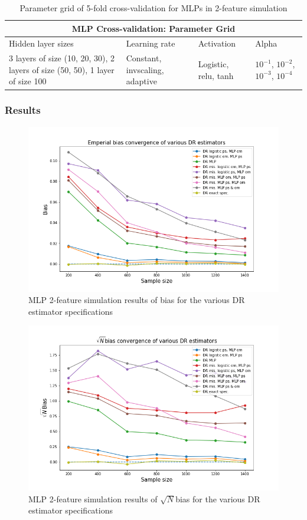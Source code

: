 \documentclass[12pt,twoside]{article}
\begin{document}
\begin{table}[h!]
    \centering
\begin{tabular}{ |p{3cm}|p{3cm}|p{3cm}|p{3cm}| }
 \hline
 \multicolumn{4}{|c|}{MLP Cross-validation: Parameter Grid} \\
 \hline
 Hidden layer sizes & Learning rate & Activation & Alpha\\
 \hline
 3 layers of size (10, 20, 30), 2 layers of size (50, 50), 1 layer of size 100 & Constant, invscaling, adaptive & Logistic, relu, tanh & $10^{-1}$, $10^{-2}$, $10^{-3}$, $10^{-4}$ \\
 \hline 
\end{tabular}
\caption{Parameter grid of 5-fold cross-validation for MLPs in 2-feature simulation}
\label{tableMLP}
\end{table}

\subsubsection*{Results}

\begin{figure}[h!]
    \centering
    \includegraphics[width = 0.9\columnwidth]{figures/biasMLP.png}
    \caption{MLP 2-feature simulation results of bias for the various DR estimator specifications}
    \label{figbiasMLP}
\end{figure}

\begin{figure}[h!]
    \centering
    \includegraphics[width = 0.9\columnwidth]{figures/sqrtnMLP.png}
    \caption{MLP 2-feature simulation results of $\sqrt{N}$bias for the various DR estimator specifications}
    \label{figsqrtnMLP}
\end{figure}
\end{document}
